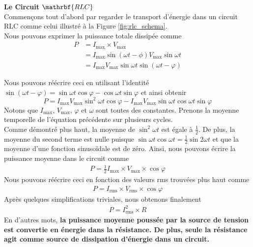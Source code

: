\documentclass[titlepage,oneside,a4paper,11pt]{book} %
\begin{document}
{\Large \textbf{Le Circuit $\mathrbf{RLC}$}}\\

Commençons tout d'abord par regarder le transport d'énergie dans un circuit RLC comme celui illustré à la Figure \ref{fig:rlc_schema}.\\

Nous pouvons exprimer la puissance totale dissipée comme
\begin{align*}
    P&=I_{\mathrm{max}}\times V_{\mathrm{max}}\\
    &=I_{\mathrm{max}}\sin(\omega t-\phi)V_{\mathrm{max}}\sin \omega t\\
    &=I_{\mathrm{max}}V_{\mathrm{max}}\sin\omega t \sin (\omega t - \varphi)
\end{align*}

Nous pouvons réécrire ceci en utilisant l'identité $\sin (\omega t-\varphi)=\sin \omega t \cos \varphi-\cos \omega t \sin \varphi$ et ainsi obtenir
\begin{equation*}
    P=I_{\mathrm{max} } V_{\mathrm{max} } \sin ^2 \omega t \cos \varphi-I_{\mathrm{max} }V_{\mathrm{max} } \sin \omega t \cos \omega t \sin \varphi
\end{equation*}
Notons que $I_{\mathrm{max}}$, $V_{\mathrm{max}}$, $\varphi$ et $\omega$ sont toutes des constantes. Prenons la moyenne temporelle de l'équation précédente sur plusieurs cycles.\\

Comme démontré plus haut, la moyenne de $\sin ^2 \omega t$ est égale à $\frac{1}{2}$.  De plus, la moyenne du second terme est nulle puisque $\sin \omega t \cos \omega t = \frac{1}{2}\sin 2\omega t$ et que la moyenne d'une fonction sinusoïdale est de zéro. Ainsi, nous pouvons écrire la puissance moyenne dans le circuit comme
\begin{align*}
    P=\frac{1}{2}I_{\mathrm{max}}\times V_{\mathrm{max}}\times\cos\varphi
\end{align*}
Nous pouvons réécrire ceci en fonction des valeurs rms trouvées plus haut comme
\begin{align}
    P=I_{\mathrm{rms}}\times V_{\mathrm{rms}}\times \cos \varphi
    \label{eq:p_phase}
\end{align}
Après quelques simplifications triviales, nous obtenons finalement
\begin{align*}
    P=I_{\mathrm{rms}}^2\times R
    \label{eq:dissipation}
\end{align*}
En d'autres mots, \textbf{la puissance moyenne poussée par la source de tension est convertie en énergie dans la résistance. De plus, seule la résistance agit comme source de dissipation d'énergie dans un circuit.}\\
\end{document}

